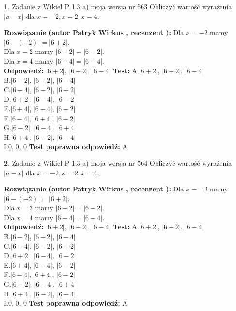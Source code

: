 \documentclass[12pt, a4paper]{article}
\theoremstyle{definition} %
\newtheorem{zad}{}
\newcommand{\zadStart}[1]{\begin{zad}#1\newline}
\newcommand{\zadStop}{\end{zad}}
\newcommand{\rozwStart}[2]{\noindent \textbf{Rozwiązanie (autor #1 , recenzent #2): }\newline}
\newcommand{\rozwStop}{\newline}
\newcommand{\odpStart}{\noindent \textbf{Odpowiedź:}\newline}
\newcommand{\odpStop}{\newline}
\newcommand{\testStart}{\noindent \textbf{Test:}\newline}
\newcommand{\testStop}{\newline}
\newcommand{\kluczStart}{\noindent \textbf{Test poprawna odpowiedź:}\newline}
\newcommand{\kluczStop}{\newline}
\begin{document}
\zadStart{Zadanie z Wikieł P 1.3 a) moja wersja nr 563}
Obliczyć wartość wyrażenia $|a - x|$ dla $x=-2,x=2,x=4$.
\zadStop
\rozwStart{Patryk Wirkus}{}
Dla $x = -2$ mamy $|6 - (-2)| = |6 + 2|$.\\
Dla $x = 2$ mamy $|6 - 2| = |6 - 2|$.\\
Dla $x = 4$ mamy $|6 - 4| = |6 - 4|$.\\
\rozwStop
\odpStart
$|6 + 2|$, $|6 - 2|$, $|6 - 4|$
\odpStop
\testStart
A.$|6 + 2|$, $|6 - 2|$, $|6 - 4|$\\
B.$|6 - 2|$, $|6 + 2|$, $|6 - 4|$\\
C.$|6 - 4|$, $|6 - 2|$, $|6 + 2|$\\
D.$|6 + 2|$, $|6 - 4|$, $|6 - 2|$\\
E.$|6 + 4|$, $|6 - 4|$, $|6 - 2|$\\
F.$|6 - 4|$, $|6 + 4|$, $|6 - 2|$\\
G.$|6 - 2|$, $|6 - 4|$, $|6 + 4|$\\
H.$|6 + 4|$, $|6 - 2|$, $|6 - 4|$\\
I.$0$, $0$, $0$
\testStop
\kluczStart
A
\kluczStop



\zadStart{Zadanie z Wikieł P 1.3 a) moja wersja nr 564}
Obliczyć wartość wyrażenia $|a - x|$ dla $x=-2,x=2,x=4$.
\zadStop
\rozwStart{Patryk Wirkus}{}
Dla $x = -2$ mamy $|6 - (-2)| = |6 + 2|$.\\
Dla $x = 2$ mamy $|6 - 2| = |6 - 2|$.\\
Dla $x = 4$ mamy $|6 - 4| = |6 - 4|$.\\
\rozwStop
\odpStart
$|6 + 2|$, $|6 - 2|$, $|6 - 4|$
\odpStop
\testStart
A.$|6 + 2|$, $|6 - 2|$, $|6 - 4|$\\
B.$|6 - 2|$, $|6 + 2|$, $|6 - 4|$\\
C.$|6 - 4|$, $|6 - 2|$, $|6 + 2|$\\
D.$|6 + 2|$, $|6 - 4|$, $|6 - 2|$\\
E.$|6 + 4|$, $|6 - 4|$, $|6 - 2|$\\
F.$|6 - 4|$, $|6 + 4|$, $|6 - 2|$\\
G.$|6 - 2|$, $|6 - 4|$, $|6 + 4|$\\
H.$|6 + 4|$, $|6 - 2|$, $|6 - 4|$\\
I.$0$, $0$, $0$
\testStop
\kluczStart
A
\kluczStop
\end{document}
